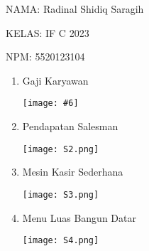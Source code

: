 \documentclass[8pt, a4paper]{article}
\date{}
\newcommand{\lstinputwithcaption}[2]{%
}
\newcommand{\codeListing}[6] {

  \begin{multicols}{2}
    \lstinputwithcaption{#1}{#2}

    \columnbreak

    \lstinputwithcaption{#3}{#4}

    \begin{center}
      \texttt{[image: \#6]}
    \end{center}

  \end{multicols}


}
\begin{document}
NAMA: Radinal Shidiq Saragih

KELAS: IF C 2023

NPM: 5520123104

\begin{enumerate}
  \item Gaji Karyawan

      \codeListing
        {./code/src/No3/Karyawan.java}{Karyawan.java}
        {./code/src/No3/Main.java}{Main.java}
        {0.5}{S1.png}

  \item Pendapatan Salesman

    \begin{multicols}{2}
      \lstinputwithcaption{./code/src/No5/Main.java}{Main.java}
      \texttt{[image: S2.png]}
      \end{multicols}


  \item Mesin Kasir Sederhana

    \begin{multicols}{2}
    \lstinputwithcaption{./code/src/No6/Main.java}{Main.java}
    \texttt{[image: S3.png]}
    \end{multicols}


  \item Menu Luas Bangun Datar

    \begin{multicols}{2}
    \lstinputwithcaption{./code/src/No7/Main.java}{Main.java}
    \texttt{[image: S4.png]}
    \end{multicols}


\end{enumerate}
\end{document}
